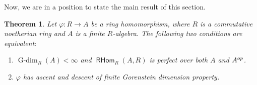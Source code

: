 \documentclass{amsart}
\newcommand{\Z}{\mathbb{Z}}
\newcommand{\D}{\mathsf{D}}
\newcommand{\0}{{\bf{0}}}
\DeclareMathOperator{\Ima}{Im}
\DeclareMathOperator{\Gdim}{G-dim}
\DeclareMathOperator{\RHom}{\mathsf{RHom}}
\newtheorem{theorem}{Theorem}[section]
\theoremstyle{definition}
\begin{document}

Now, we are in a position to state the main result of this section.

\begin{theorem}\label{observation}
Let $\varphi\colon R\rightarrow A$ be a ring homomorphism, where $R$ is a commutative noetherian ring and $A$ is a finite $R$-algebra.
The following two conditions are equivalent$\colon$
\begin{enumerate}
\item\label{basic}  $\Gdim_R(A)<\infty$ and $\RHom_R(A,R)$ is perfect over both $A$ and $A^{\rm op}$.

\item\label{TF} $\varphi$ has ascent and descent of finite Gorenstein dimension property.
\end{enumerate}
\end{theorem}
\end{document}
